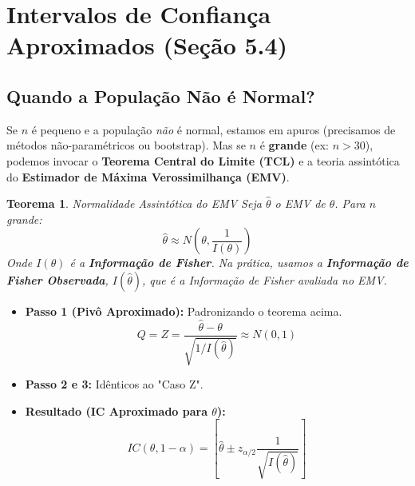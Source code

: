 \documentclass[12pt, a4paper]{article}
\newtheorem{teorema}{Teorema}[section]
\theoremstyle{definition} %
\theoremstyle{remark} %
\begin{document}
\section{Intervalos de Confiança Aproximados (Seção 5.4)}

\subsection{Quando a População Não é Normal?}
Se $n$ é pequeno e a população \textit{não} é normal, estamos em apuros (precisamos de métodos não-paramétricos ou bootstrap).
Mas se $n$ é \textbf{grande} (ex: $n > 30$), podemos invocar o \textbf{Teorema Central do Limite (TCL)} e a teoria assintótica do \textbf{Estimador de Máxima Verossimilhança (EMV)}.

\begin{teorema}{Normalidade Assintótica do EMV}
    Seja $\hat{\theta}$ o EMV de $\theta$. Para $n$ grande:
    $$ \hat{\theta} \approx N\left(\theta, \frac{1}{I(\theta)}\right) $$
    Onde $I(\theta)$ é a \textbf{Informação de Fisher}. Na prática, usamos a \textbf{Informação de Fisher Observada}, $I(\hat{\theta})$, que é a Informação de Fisher avaliada no EMV.
\end{teorema}

\begin{itemize}
    \item \textbf{Passo 1 (Pivô Aproximado):} Padronizando o teorema acima.
        $$ Q = Z = \frac{\hat{\theta} - \theta}{\sqrt{1 / I(\hat{\theta})}} \approx N(0,1) $$
    \item \textbf{Passo 2 e 3:} Idênticos ao "Caso Z".
    \item \textbf{Resultado (IC Aproximado para $\theta$):}
        $$ IC(\theta, 1-\alpha) = \left[ \hat{\theta} \pm z_{\alpha/2} \frac{1}{\sqrt{I(\hat{\theta})}} \right] $$
\end{itemize}
\end{document}
